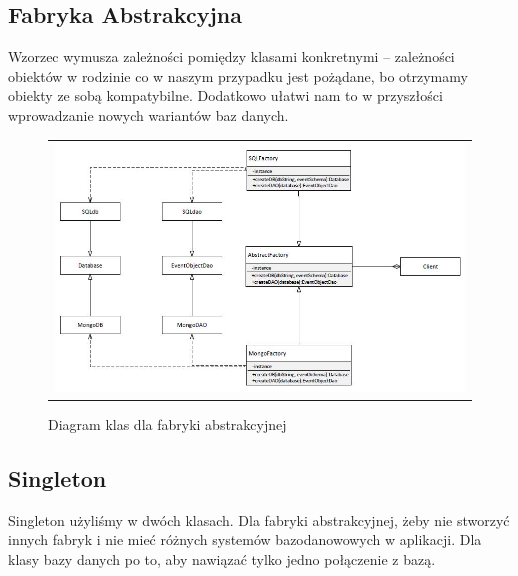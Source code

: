 \documentclass{sprawozdanie-agh}
\begin{document}
	\subsection{Fabryka Abstrakcyjna}
	
	Wzorzec wymusza zależności pomiędzy klasami konkretnymi – zależności obiektów w rodzinie co w naszym przypadku jest pożądane, bo otrzymamy obiekty ze sobą kompatybilne. Dodatkowo ułatwi nam to w przyszłości wprowadzanie nowych wariantów baz danych.
	
	\begin{figure}[H] 
		\centering
		\begin{tabular}{c}
			\includegraphics[width=.95\textwidth]{factory}
		\end{tabular} 
		\caption{Diagram klas dla fabryki abstrakcyjnej}
	\end{figure}
	
	\subsection{Singleton}
	
	Singleton użyliśmy w dwóch klasach. Dla fabryki abstrakcyjnej, żeby nie stworzyć innych fabryk i nie mieć różnych systemów bazodanowowych w aplikacji. Dla klasy bazy danych po to, aby	nawiązać tylko jedno połączenie z bazą.
	
\end{document}
